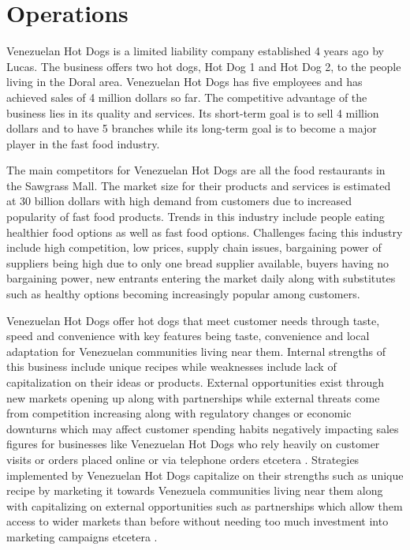 

\section{Operations}\label{sec:operations} Venezuelan Hot Dogs is a limited liability company established 4 years ago by Lucas. The business offers two hot dogs, Hot Dog 1 and Hot Dog 2, to the people living in the Doral area. Venezuelan Hot Dogs has five employees and has achieved sales of 4 million dollars so far. The competitive advantage of the business lies in its quality and services. Its short-term goal is to sell 4 million dollars and to have 5 branches while its long-term goal is to become a major player in the fast food industry. 

The main competitors for Venezuelan Hot Dogs are all the food restaurants in the Sawgrass Mall. The market size for their products and services is estimated at 30 billion dollars with high demand from customers due to increased popularity of fast food products. Trends in this industry include people eating healthier food options as well as fast food options. Challenges facing this industry include high competition, low prices, supply chain issues, bargaining power of suppliers being high due to only one bread supplier available, buyers having no bargaining power, new entrants entering the market daily along with substitutes such as healthy options becoming increasingly popular among customers. 

Venezuelan Hot Dogs offer hot dogs that meet customer needs through taste, speed and convenience with key features being taste, convenience and local adaptation for Venezuelan communities living near them. Internal strengths of this business include unique recipes while weaknesses include lack of capitalization on their ideas or products. External opportunities exist through new markets opening up along with partnerships while external threats come from competition increasing along with regulatory changes or economic downturns which may affect customer spending habits negatively impacting sales figures for businesses like Venezuelan Hot Dogs who rely heavily on customer visits or orders placed online or via telephone orders etcetera . Strategies implemented by Venezuelan Hot Dogs capitalize on their strengths such as unique recipe by marketing it towards Venezuela communities living near them along with capitalizing on external opportunities such as partnerships which allow them access to wider markets than before without needing too much investment into marketing campaigns etcetera . 

